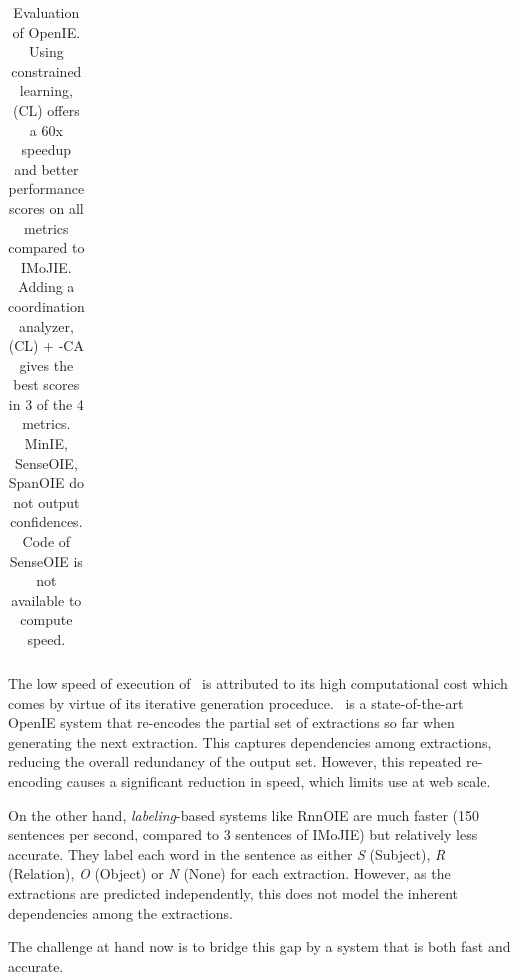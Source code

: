 \begin{table}[h]
{\begin{tabular}{lccccccccccc}
            \bottomrule
            \end{tabular}
            \caption{Evaluation of OpenIE. Using constrained learning, \shortname(CL) offers a 60x speedup and better performance scores on all metrics compared to IMoJIE. Adding a coordination analyzer, \shortname(CL) + \shortname-CA gives the best scores in 3 of the 4 metrics. MinIE, SenseOIE, SpanOIE do not output confidences. Code of SenseOIE is not available to compute speed.}
            \label{tab:main-table}
            }
        \end{table}
        
        The low speed of execution of \shortname\ is attributed to its high computational cost which comes by virtue of its iterative generation proceduce. \shortname\ is a state-of-the-art OpenIE system that re-encodes the partial set of extractions so far when generating the next extraction. This captures dependencies among extractions, reducing the overall redundancy of the output set. However, this repeated re-encoding causes a significant reduction in speed, which limits use at web scale.

        On the other hand, \emph{labeling}-based systems like RnnOIE \citep{stanovsky&al15} are much faster (150 sentences per second, compared to 3 sentences of IMoJIE) but relatively less accurate. They label each word in the sentence as either \textit{S} (Subject), \textit{R} (Relation), \textit{O} (Object) or \textit{N} (None) for each extraction. However, as the extractions are predicted independently, this does not model the inherent dependencies among the extractions.

        The challenge at hand now is to bridge this gap by a system that is both fast and accurate.

